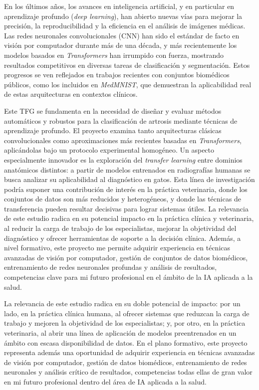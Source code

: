 \documentclass[11pt,spanish,listoffigures,listoftables]{tfgetsinf}
\begin{document}
En los últimos años, los avances en inteligencia artificial, y en particular en
aprendizaje profundo (\textit{deep learning}), han abierto nuevas vías para
mejorar la precisión, la reproducibilidad y la eficiencia en el análisis de
imágenes médicas. Las redes neuronales convolucionales (CNN) han sido el
estándar de facto en visión por computador durante más de una década, y más
recientemente los modelos basados en \textit{Transformers} han irrumpido con
fuerza, mostrando resultados competitivos en diversas tareas de clasificación y
segmentación. Estos progresos se ven reflejados en trabajos recientes con
conjuntos biomédicos públicos, como los incluidos en \emph{MedMNIST}, que
demuestran la aplicabilidad real de estas arquitecturas en contextos clínicos.

Este TFG se fundamenta en la necesidad de diseñar y evaluar métodos
automáticos y robustos para la clasificación de artrosis mediante técnicas de
aprendizaje profundo. El proyecto examina tanto arquitecturas clásicas
convolucionales como aproximaciones más recientes basadas en
\textit{Transformers}, aplicándolas bajo un protocolo experimental homogéneo.
Un aspecto especialmente innovador es la exploración del
\textit{transfer learning} entre dominios anatómicos distintos: a partir de
modelos entrenados en radiografías humanas se busca analizar su aplicabilidad
al diagnóstico en gatos. Esta línea de investigación podría suponer una
contribución de interés en la práctica veterinaria, donde los conjuntos de
datos son más reducidos y heterogéneos, y donde las técnicas de transferencia
pueden resultar decisivas para lograr sistemas útiles.
La relevancia de este estudio radica en su potencial impacto en la práctica
clínica y veterinaria, al reducir la carga de trabajo de los especialistas,
mejorar la objetividad del diagnóstico y ofrecer herramientas de soporte a la
decisión clínica. Además, a nivel formativo, este proyecto me permite adquirir
experiencia en técnicas avanzadas de visión por computador, gestión de
conjuntos de datos biomédicos, entrenamiento de redes neuronales profundas y
análisis de resultados, competencias clave para mi futuro profesional en el
ámbito de la IA aplicada a la salud.

La relevancia de este estudio radica en su doble potencial de impacto: por un
lado, en la práctica clínica humana, al ofrecer sistemas que reduzcan la carga
de trabajo y mejoren la objetividad de los especialistas; y, por otro, en la
práctica veterinaria, al abrir una línea de aplicación de modelos
preentrenados en un ámbito con escasa disponibilidad de datos. En el plano
formativo, este proyecto representa además una oportunidad de adquirir
experiencia en técnicas avanzadas de visión por computador, gestión de datos
biomédicos, entrenamiento de redes neuronales y análisis crítico de resultados,
competencias todas ellas de gran valor en mi futuro profesional dentro del
área de IA aplicada a la salud.
\end{document}
